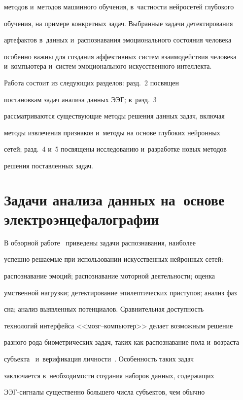 методов и~методов машинного обучения, в~частности нейросетей глубокого 

обучения, на примере конкретных задач. Выбранные задачи детектирования 

артефактов в~данных и~распознавания эмоционального состояния человека 

особенно важны для создания аффективных систем взаимодействия человека и~компьютера и~систем эмоционального искусственного интеллекта. 

     

     Работа состоит из следующих разделов: разд.~2 посвящен 

постановкам задач анализа данных ЭЭГ; в~разд.~3 

рассматриваются существующие методы решения данных задач, вклю\-чая 

методы извлечения признаков и~методы на основе глубоких нейронных 

сетей; разд.~4 и~5 посвящены исследованию и~разработке новых методов 

решения поставленных задач.



\section{Задачи анализа данных на~основе электроэнцефалографии}

     

     В обзорной работе~\cite{1-sha} приведены задачи распознавания, наиболее 

успешно решаемые при использовании искусственных нейронных сетей: 

распознавание эмоций; распознавание моторной деятельности; оценка 

умственной нагрузки; детектирование эпилептических приступов; анализ фаз 

сна; анализ выявленных потенциалов. Сравнительная доступность 

технологий интерфейса <<мозг--ком\-пью\-тер>> делает возможным решение 

разного рода биометрических задач, таких как распознавание пола и~возраста 

субъекта~\cite{2-sha} и~верификация личности~\cite{3-sha}. Особенность таких задач 

заключается в~необходимости создания наборов данных, содержащих  

ЭЭГ-сиг\-на\-лы существенно большего числа субъектов, чем обычно 

